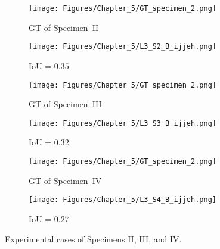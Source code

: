 \begin{figure} [!h]
	\centering
	\begin{subfigure}[b]{0.47\textwidth}
		\centering
		\texttt{[image: Figures/Chapter\_5/GT\_specimen\_2.png]}
		\caption{GT of Specimen~II}
		\label{fig:GT_specimen_2}
	\end{subfigure}
	\hfill
	\begin{subfigure}[b]{0.47\textwidth}
		\centering
		\texttt{[image: Figures/Chapter\_5/L3\_S2\_B\_ijjeh.png]}
		\caption{IoU = \(0.35\)} 
		\label{fig:L3_S2_B_ijjeh}
	\end{subfigure}
	\par\medskip
	\begin{subfigure}[b]{0.47\textwidth}
		\centering
		\texttt{[image: Figures/Chapter\_5/GT\_specimen\_2.png]}
		\caption{GT of Specimen~III}
		\label{fig:gt_specimen_3}
	\end{subfigure}
	\hfill
	\begin{subfigure}[b]{0.47\textwidth}
		\centering
		\texttt{[image: Figures/Chapter\_5/L3\_S3\_B\_ijjeh.png]}
		\caption{IoU = \(0.32\)} 
		\label{fig:L3_S3_B_ijjeh}
	\end{subfigure}
	\par\medskip
	\begin{subfigure}[b]{0.47\textwidth}
		\centering
		\texttt{[image: Figures/Chapter\_5/GT\_specimen\_2.png]}
		\caption{GT of Specimen~IV}
		\label{fig:gt_specimen_4}
	\end{subfigure}
	\hfill
	\begin{subfigure}[b]{0.47\textwidth}
		\centering
		\texttt{[image: Figures/Chapter\_5/L3\_S4\_B\_ijjeh.png]}
		\caption{IoU = \(0.27\)} 
		\label{fig:L3_S4_B_ijjeh}
	\end{subfigure}
	\caption{Experimental cases of Specimens II, III, and IV.}
	\label{fig:exp_case}
\end{figure} 
